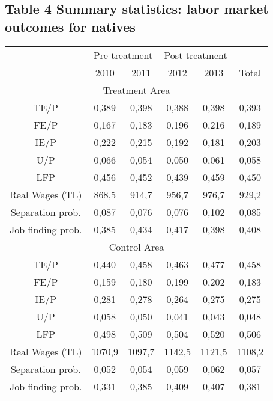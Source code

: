 \documentclass{article}
\begin{document}
        \begin{table}[h]
        \subsection*{Table 4 Summary statistics: labor market outcomes for natives}
    
            \begin{tabular}{|cccccc|}
            \hline
                 & \multicolumn{2}{|c|}{Pre-treatment} & \multicolumn{2}{|c|}{Post-treatment} &\\
                 & 2010 & 2011 & 2012 & 2013 & Total \\ \hline
                \multicolumn{8}{|c|}{Treatment Area}\\ \hline  
                TE/P & 0,389 & 0,398 & 0,388 & 0,398 & 0,393 \\  
                FE/P  & 0,167 & 0,183 & 0,196 & 0,216 & 0,189 \\ 
                IE/P & 0,222 & 0,215 & 0,192 & 0,181 & 0,203 \\ 
               U/P & 0,066 & 0,054 & 0,050 & 0,061 & 0,058 \\ 
               LFP & 0,456 & 0,452 & 0,439 & 0,459 & 0,450 \\
                Real Wages (TL) & 868,5 & 914,7 & 956,7 & 976,7 & 929,2
                \\
                Separation prob. & 0,087 & 0,076 & 0,076 & 0,102 & 0,085 \\
                Job finding prob. & 0,385 & 0,434 & 0,417 & 0,398 & 0,408 \\
                \hline
                \multicolumn{8}{|c|}{Control Area}\\ \hline
               TE/P & 0,440 & 0,458 & 0,463 & 0,477 & 0,458 \\
                FE/P & 0,159 & 0,180 & 0,199 & 0,202 & 0,183 \\ 
               IE/P & 0,281 & 0,278 & 0,264 & 0,275 & 0,275\\ 
               U/P & 0,058 & 0,050 & 0,041 & 0,043 & 0,048 \\ 
               LFP & 0,498 & 0,509 & 0,504 & 0,520 & 0,506 \\
                Real Wages (TL) & 1070,9 & 1097,7 & 1142,5 & 1121,5 & 1108,2 \\
                 Separation prob. & 0,052 & 0,054 & 0,059 & 0,062 & 0,057 \\
                Job finding prob. & 0,331 & 0,385 & 0,409 & 0,407 & 0,381 \\
                \hline
            \end{tabular}
        \end{table}
\end{document}
